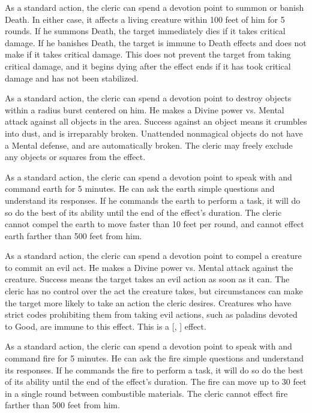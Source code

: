             As a standard action, the cleric can spend a devotion point to summon or banish Death.
            In either case, it affects a living creature within 100 feet of him for 5 rounds.
            If he summons Death, the target immediately dies if it takes critical damage.
            If he banishes Death, the target is immune to Death effects and does not make  if it takes critical damage.
            This does not prevent the target from taking critical damage, and it begins dying after the effect ends if it has took critical damage and has not been stabilized.

            As a standard action, the cleric can spend a devotion point to destroy objects within a \arealarge radius burst centered on him.
            He makes a Divine power vs. Mental attack against all objects in the area.
            Success against an object means it crumbles into dust, and is irreparably broken.
            Unattended nonmagical objects do not have a Mental defense, and are automatically broken.
            The cleric may freely exclude any objects or squares from the effect.

            As a standard action, the cleric can spend a devotion point to speak with and command earth for 5 minutes.
            He can ask the earth simple questions and understand its responses.
            If he commands the earth to perform a task, it will do so do the best of its ability until the end of the effect's duration.
            The cleric cannot compel the earth to move faster than 10 feet per round, and cannot effect earth farther than 500 feet from him.

            As a standard action, the cleric can spend a devotion point to compel a creature to commit an evil act.
            He makes a Divine power vs. Mental attack against the creature.
            Success means the target takes an evil action as soon as it can.
            The cleric has no control over the act the creature takes, but circumstances can make the target more likely to take an action the cleric desires.
            Creatures who have strict codes prohibiting them from taking evil actions, such as paladins devoted to Good, are immune to this effect.
            This is a [, ] effect.

            As a standard action, the cleric can spend a devotion point to speak with and command fire for 5 minutes.
            He can ask the fire simple questions and understand its responses.
            If he commands the fire to perform a task, it will do so do the best of its ability until the end of the effect's duration.
            The fire can move up to 30 feet in a single round between combustible materials.
            The cleric cannot effect fire farther than 500 feet from him.

